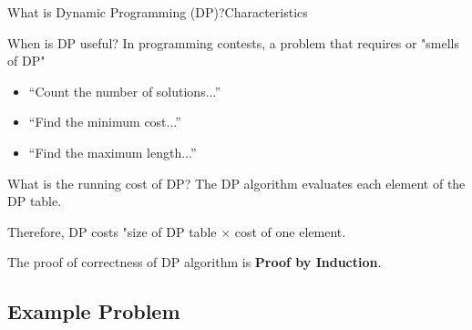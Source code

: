 \begin{frame}{What is Dynamic Programming (DP)?}{Characteristics}

  \begin{block}{When is DP useful?}
    In programming contests, a problem that requires  or  "smells of DP"
    \begin{itemize}
    \item ``Count the number of solutions...''
    \item ``Find the minimum cost...''
    \item ``Find the maximum length...''
    \end{itemize}
  \end{block}

  \begin{exampleblock}{What is the running cost of DP?}
    The DP algorithm evaluates each element of the DP table.\medskip

    Therefore, DP costs "size of DP table $\times$ cost of one element.\medskip

  \end{exampleblock}
  The proof of correctness of DP algorithm is {\bf Proof by Induction}.
\end{frame}

\subsection{Example Problem}

